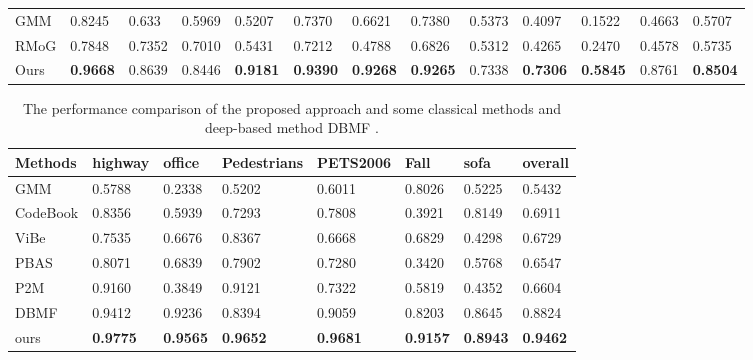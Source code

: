\documentclass[journal]{IEEEtran}
\begin{document}
\begin{table}[!t]
\begin{tabular}{lllllllllllll}
GMM         & 0.8245   & 0.633   & 0.5969     & 0.5207    & 0.7370 & 0.6621  & 0.7380   & 0.5373     & 0.4097     & 0.1522 & 0.4663  & 0.5707  \\
RMoG        & 0.7848   & 0.7352  & 0.7010     & 0.5431    & 0.7212 & 0.4788  & 0.6826   & 0.5312     & 0.4265     & 0.2470 & 0.4578  & 0.5735  \\ \hline
Ours        & \textbf{0.9668}   & 0.8639  & 0.8446     & \textbf{0.9181}    & \textbf{0.9390} & \textbf{0.9268}  & \textbf{0.9265}   & 0.7338     & \textbf{0.7306}     & \textbf{0.5845} & 0.8761  & \textbf{0.8504} \\ \hline
\end{tabular}
\end{table}

\begin{table}[!t]
\centering
\caption{The performance comparison of the proposed approach and some classical methods and deep-based method DBMF .}
\label{tab2}
\begin{tabular}{llllllll}
\hline
Methods  & highway & office & Pedestrians & PETS2006 & Fall   & sofa   & overall \\ \hline
GMM      & 0.5788  & 0.2338 & 0.5202      & 0.6011   & 0.8026 & 0.5225 & 0.5432  \\
CodeBook & 0.8356  & 0.5939 & 0.7293      & 0.7808   & 0.3921 & 0.8149 & 0.6911  \\
ViBe     & 0.7535  & 0.6676 & 0.8367      & 0.6668   & 0.6829 & 0.4298 & 0.6729  \\
PBAS     & 0.8071  & 0.6839 & 0.7902      & 0.7280   & 0.3420 & 0.5768 & 0.6547  \\
P2M      & 0.9160  & 0.3849 & 0.9121      & 0.7322   & 0.5819 & 0.4352 & 0.6604  \\
DBMF     & 0.9412  & 0.9236 & 0.8394      & 0.9059   & 0.8203 & 0.8645 & 0.8824  \\ \hline
ours     & \textbf{0.9775}  & \textbf{0.9565} & \textbf{0.9652}      & \textbf{0.9681}   & \textbf{0.9157} & \textbf{0.8943} & \textbf{0.9462}  \\ \hline
\end{tabular}
\end{table}
\end{document}
